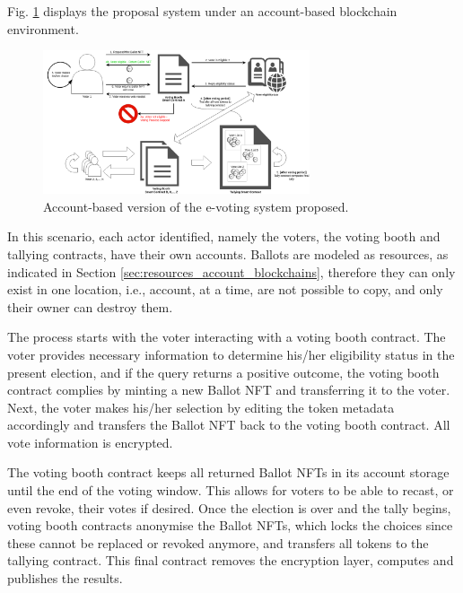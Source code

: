 \documentclass[./4_GeneralApproach.tex]{subfiles}
\begin{document}
Fig. \ref{fig:account_based_architecture} displays the proposal system under an account-based blockchain environment.

\begin{figure}[htp]
    \centering
    \includegraphics[width=0.7\textwidth]{../Images/03_account_based_solution.png}
    \caption{Account-based version of the e-voting system proposed.}
    \label{fig:account_based_architecture}
\end{figure}

In this scenario, each actor identified, namely the voters, the voting booth and tallying contracts, have their own accounts. Ballots are modeled as resources, as indicated in Section \ref{sec:resources_account_blockchains}, therefore they can only exist in one location, i.e., account, at a time, are not possible to copy, and only their owner can destroy them.
\par
The process starts with the voter interacting with a voting booth contract. The voter provides necessary information to determine his/her eligibility status in the present election, and if the query returns a positive outcome, the voting booth contract complies by minting a new Ballot NFT and transferring it to the voter. Next, the voter makes his/her selection by editing the token metadata accordingly and transfers the Ballot NFT back to the voting booth contract. All vote information is encrypted.
\par
The voting booth contract keeps all returned Ballot NFTs in its account storage until the end of the voting window. This allows for voters to be able to recast, or even revoke, their votes if desired. Once the election is over and the tally begins, voting booth contracts anonymise the Ballot NFTs, which locks the choices since these cannot be replaced or revoked anymore, and transfers all tokens to the tallying contract. This final contract removes the encryption layer, computes and publishes the results.
\end{document}

